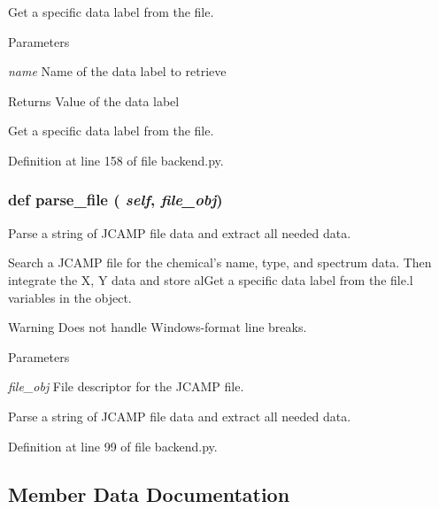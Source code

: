 Get a specific data label from the file. 


\begin{DoxyParams}{Parameters}
\item[{\em name}]Name of the data label to retrieve \end{DoxyParams}
\begin{DoxyReturn}{Returns}
Value of the data label\begin{DoxyVerb}Get a specific data label from the file.\end{DoxyVerb}
 
\end{DoxyReturn}


Definition at line 158 of file backend.py.

\hypertarget{classbackend_1_1_spectrum_a14401ccceaf67f005506de0a8320b089}{
\subsubsection[{parse\_\-file}]{\setlength{\rightskip}{0pt plus 5cm}def parse\_\-file ( {\em self}, \/   {\em file\_\-obj})}}
\label{classbackend_1_1_spectrum_a14401ccceaf67f005506de0a8320b089}


Parse a string of JCAMP file data and extract all needed data. 

Search a JCAMP file for the chemical's name, type, and spectrum data. Then integrate the X, Y data and store alGet a specific data label from the file.l variables in the object. \begin{DoxyWarning}{Warning}
Does not handle Windows-\/format line breaks.
\end{DoxyWarning}

\begin{DoxyParams}{Parameters}
\item[{\em file\_\-obj}]File descriptor for the JCAMP file.\begin{DoxyVerb}Parse a string of JCAMP file data and extract all needed data.\end{DoxyVerb}
 \end{DoxyParams}


Definition at line 99 of file backend.py.



\subsection{Member Data Documentation}
\hypertarget{classbackend_1_1_spectrum_a77c112c599aae1eeb8d54936bb435177}{
\subsubsection[{chemical\_\-name}]{}}
\label{classbackend_1_1_spectrum_a77c112c599aae1eeb8d54936bb435177}



